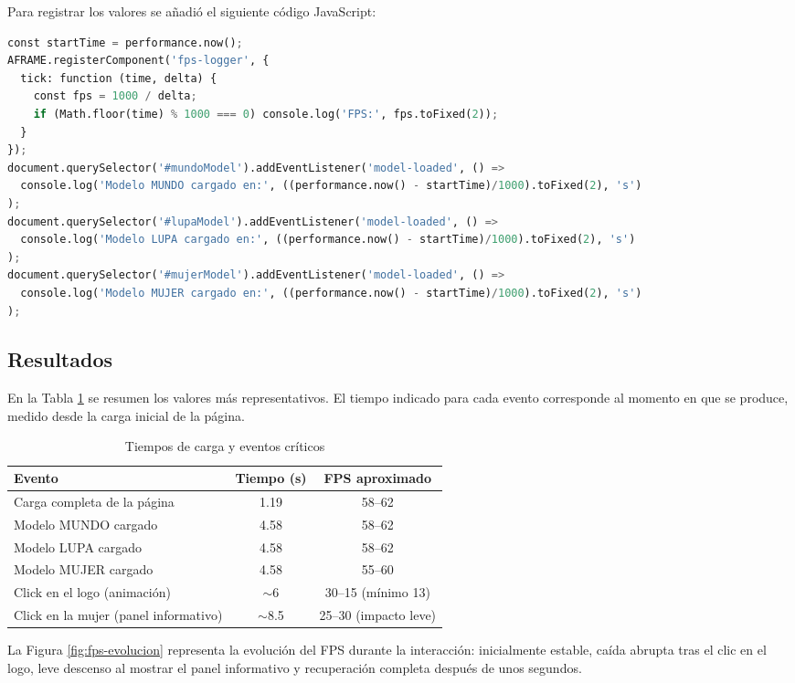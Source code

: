 Para registrar los valores se añadió el siguiente código JavaScript:

\begin{lstlisting}[language=Python, caption={Fragmento de código para medición de FPS y eventos clave}]
const startTime = performance.now();
AFRAME.registerComponent('fps-logger', {
  tick: function (time, delta) {
    const fps = 1000 / delta;
    if (Math.floor(time) % 1000 === 0) console.log('FPS:', fps.toFixed(2));
  }
});
document.querySelector('#mundoModel').addEventListener('model-loaded', () =>
  console.log('Modelo MUNDO cargado en:', ((performance.now() - startTime)/1000).toFixed(2), 's')
);
document.querySelector('#lupaModel').addEventListener('model-loaded', () =>
  console.log('Modelo LUPA cargado en:', ((performance.now() - startTime)/1000).toFixed(2), 's')
);
document.querySelector('#mujerModel').addEventListener('model-loaded', () =>
  console.log('Modelo MUJER cargado en:', ((performance.now() - startTime)/1000).toFixed(2), 's')
);
\end{lstlisting}

\subsection{Resultados}
En la Tabla \ref{tab:rendimiento-ar} se resumen los valores más representativos. El tiempo indicado para cada evento corresponde al momento en que se produce, medido desde la carga inicial de la página.


\begin{table}[H]
\centering
\caption{Tiempos de carga y eventos críticos}
\label{tab:rendimiento-ar}
\begin{tabular}{|l|c|c|}
\hline
\textbf{Evento} & \textbf{Tiempo (s)} & \textbf{FPS aproximado} \\
\hline
Carga completa de la página & 1.19 & 58--62 \\
Modelo MUNDO cargado & 4.58 & 58--62 \\
Modelo LUPA cargado & 4.58 & 58--62 \\
Modelo MUJER cargado & 4.58 & 55--60 \\
Click en el logo (animación) & $\sim$6 & 30--15 (mínimo 13) \\
Click en la mujer (panel informativo) & $\sim$8.5 & 25--30 (impacto leve) \\
\hline
\end{tabular}
\end{table}

La Figura \ref{fig:fps-evolucion} representa la evolución del FPS durante la interacción: inicialmente estable, caída abrupta tras el clic en el logo, leve descenso al mostrar el panel informativo y recuperación completa después de unos segundos.

